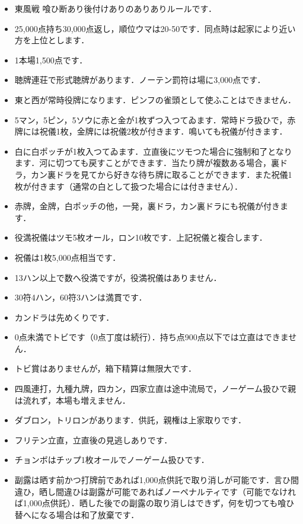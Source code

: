 \documentclass[uplatex]{jsarticle}
\theoremstyle{definition}
\begin{document}
\begin{itemize}
    \item 東風戦 喰ひ断あり後付けありのありありルールです．
    \item 25,000点持ち30,000点返し，順位ウマは20-50です．同点時は起家により近い方を上位とします．
    \item 1本場1,500点です．
    \item 聴牌連荘で形式聴牌があります．ノーテン罰符は場に3,000点です．
    \item 東と西が常時役牌になります．ピンフの雀頭として使ふことはできません．
    \item 5マン，5ピン，5ソウに赤と金が1枚ずつ入つてゐます．常時ドラ扱ひで，赤牌には祝儀1枚，金牌には祝儀2枚が付きます．鳴いても祝儀が付きます．
    \item 白に白ポッチが1枚入つてゐます．立直後にツモつた場合に強制和了となります．河に切つても戻すことができます．当たり牌が複数ある場合，裏ドラ，カン裏ドラを見てから好きな待ち牌に取ることができます．また祝儀1枚が付きます（通常の白として扱つた場合には付きません）．
    \item 赤牌，金牌，白ポッチの他，一発，裏ドラ，カン裏ドラにも祝儀が付きます．
    \item 役満祝儀はツモ5枚オール，ロン10枚です．上記祝儀と複合します．
    \item 祝儀は1枚5,000点相当です．
    \item 13ハン以上で数へ役満ですが，役満祝儀はありません．
    \item 30符4ハン，60符3ハンは満貫です．
    \item カンドラは先めくりです．
    \item 0点未満でトビです（0点丁度は続行）．持ち点900点以下では立直はできません．
    \item トビ賞はありませんが，箱下精算は無限大です．
    \item 四風連打，九種九牌，四カン，四家立直は途中流局で，ノーゲーム扱ひで親は流れず，本場も増えません．
    \item ダブロン，トリロンがあります．供託，親権は上家取りです．
    \item フリテン立直，立直後の見逃しありです．
    \item チョンボはチップ1枚オールでノーゲーム扱ひです．
    \item 副露は晒す前かつ打牌前であれば1,000点供託で取り消しが可能です．言ひ間違ひ，晒し間違ひは副露が可能であればノーペナルティです（可能でなければ1,000点供託）．晒した後での副露の取り消しはできず，何を切つても喰ひ替へになる場合は和了放棄です．

\end{itemize}
\end{document}
